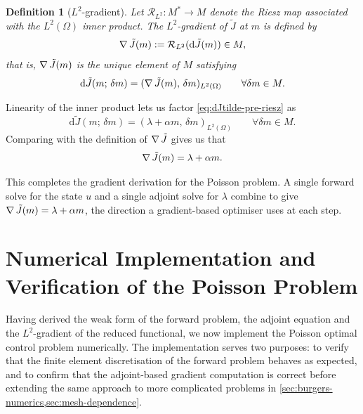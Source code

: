 \documentclass[a4paper,11pt]{article}
\newcommand{\Om}{\Omega}
\newcommand{\Lp}[1]{L^{2}(#1)}              %
\newcommand{\inner}[3]{(#1,\,#2)_{#3}}        %
\newcommand{\Rmap}{\mathcal{R}}              %
\newcommand{\Jt}{\tilde{J}}                  %
\newcommand{\Mspace}{M}
\theoremstyle{spacedplain} \newtheorem{theorem}[counter]{Theorem} \newtheorem{lemma}[counter]{Lemma} \newtheorem{prop}[counter]{Proposition} \newtheorem{cor}[counter]{Corollary}
\theoremstyle{spaceddefinition} \newtheorem{defn}[counter]{Definition} \newtheorem{example}[counter]{Example} \newtheorem{remark}[counter]{Remark}
\begin{document}
\begin{defn}[$L^2$-gradient]
\label{defn:l2gradient} Let $\Rmap_{L^2} : \Mspace^{*} \to \Mspace$ denote the Riesz map associated with the $\Lp{\Om}$ inner product. The \emph{$L^2$-gradient} of $\Jt$ at $m$ is defined by
\begin{equation}
  \grad \Jt(m) := \Rmap_{L^2}(\mathrm{d}\Jt(m)) \in \Mspace,
\end{equation}
that is, $\grad \Jt(m)$ is the unique element of $\Mspace$ satisfying
\begin{equation}
  \mathrm{d}\Jt(m;\, \delta m)
  = \inner{\grad \Jt(m)}{\delta m}{\Lp{\Om}}
  \qquad \forall \delta m \in \Mspace.
\end{equation}
\end{defn}

Linearity of the inner product lets us factor \cref{eq:dJtilde-pre-riesz} as
\begin{equation}
  \mathrm{d}\Jt(m;\, \delta m)
  = \inner{\lambda + \alpha m}{\delta m}{\Lp{\Om}}
  \qquad \forall \delta m \in \Mspace.
\end{equation}
Comparing with the definition of $\grad \Jt$ gives us that
\begin{equation}
    \grad \Jt(m) = \lambda + \alpha m.
  \label{eq:l2gradient-poisson}
\end{equation}

This completes the gradient derivation for the Poisson problem. A single forward solve for the state $u$ and a single adjoint solve for $\lambda$ combine to give $\grad \Jt(m) = \lambda + \alpha m$, the direction a gradient-based optimiser uses at each step.

\section{Numerical Implementation and Verification of the Poisson Problem}
\label{sec:poisson-numerics}

Having derived the weak form of the forward problem, the adjoint equation and the $L^2$-gradient of the reduced functional, we now implement the Poisson optimal control problem numerically. The implementation serves two purposes: to verify that the finite element discretisation of the forward problem behaves as expected, and to confirm that the adjoint-based gradient computation is correct before extending the same approach to more complicated problems in \cref{sec:burgers-numerics,sec:mesh-dependence}.
\end{document}
